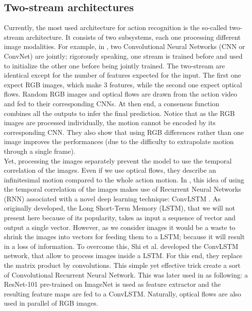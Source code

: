 \documentclass[12pt, a4paper]{report}
\begin{document}
			\subsection{Two-stream architectures}\label{twostream}
				Currently, the most used architecture for action recognition is the so-called two-stream architecture.
				It consists of two subsystems, each one processing different image modalities.
				For example, in \cite{wang}, two Convolutional Neural Networks (CNN or ConvNet) are \gls{jointly}; rigorously speaking, one stream is trained before and used to initialize the other one before being jointly trained.
				The two-stream are identical except for the number of features expected for the input.
				The first one expect RGB images, which make 3 features, while the second one expect optical flows.
				Random RGB images and optical flows are drawn from the action video and fed to their corresponding CNNs.
				At then end, a consensus function combines all the outputs to infer the final prediction.
				Notice that as the RGB images are processed individually, the motion cannot be encoded by its corresponding CNN.
				They also show that using RGB differences rather than one image improves the performances (due to the difficulty to extrapolate motion through a single frame).\\
				Yet, processing the images separately prevent the model to use the temporal correlation of the images.
				Even if we use optical flows, they describe an infinitesimal motion compared to the whole action motion.
				In \cite{ye}, this idea of using the temporal correlation of the images makes use of Recurrent Neural Networks (RNN) associated with a novel deep learning technique: ConvLSTM \cite{shi}.
				As originally developed, the Long Short-Term Memory (LSTM), that we will not present here because of its popularity, takes as input a sequence of vector and output a single vector.
				However, as we consider images it would be a waste to shrink the images into vectors for feeding them to a LSTM; because it will result in a loss of information.
				To overcome this, Shi et al. developed the ConvLSTM network, that allow to process images inside a LSTM.
				For this end, they replace the matrix product by convolutions.
				This simple yet effective trick create a sort of Convolutional Recurrent Neural Network.
				This was later used in \cite{ye} as following: a ResNet-101 pre-trained on ImageNet is used as feature extractor and the resulting feature maps are fed to a ConvLSTM.
				Naturally, optical flows are also used in parallel of RGB images.\\
\end{document}

